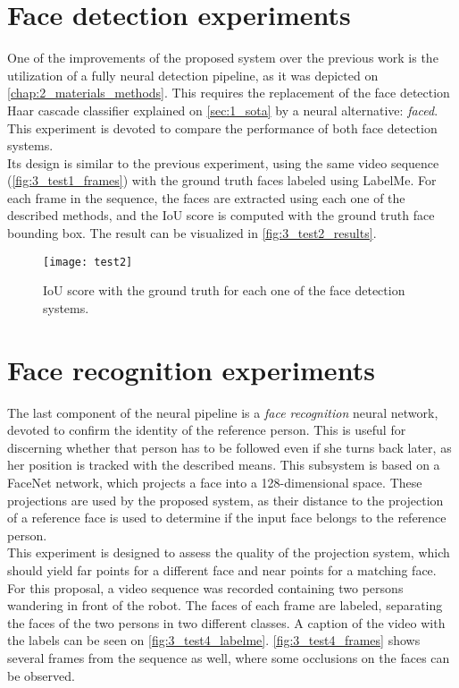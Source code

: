 \section{Face detection experiments}
\label{sec:3_test2}

One of the improvements of the proposed system over the previous work \cite{tfg} is the utilization of a fully neural detection pipeline, as it was depicted on \autoref{chap:2_materials_methods}. This requires the replacement of the face detection Haar cascade classifier explained on \autoref{sec:1_sota} by a neural alternative: \textit{faced}. This experiment is devoted to compare the performance of both face detection systems.\\

Its design is similar to the previous experiment, using the same video sequence (\autoref{fig:3_test1_frames}) with the ground truth faces labeled using LabelMe. For each frame in the sequence, the faces are extracted using each one of the described methods, and the IoU score is computed with the ground truth face bounding box. The result can be visualized in \autoref{fig:3_test2_results}.

\begin{figure}[h]
	\centering
	\texttt{[image: test2]}
	\caption{IoU score with the ground truth for each one of the face detection systems.}
	\label{fig:3_test2_results}
\end{figure}

\section{Face recognition experiments}

\label{sec:3_test4}
The last component of the neural pipeline is a \textit{face recognition} neural network, devoted to confirm the identity of the reference person. This is useful for discerning whether that person has to be followed even if she turns back later, as her position is tracked with the described means. This subsystem is based on a FaceNet \cite{facenet} network, which projects a face into a 128-dimensional space. These projections are used by the proposed system, as their distance to the projection of a reference face is used to determine if the input face belongs to the reference person.\\

This experiment is designed to assess the quality of the projection system, which should yield far points for a different face and near points for a matching face. For this proposal, a video sequence was recorded containing two persons wandering in front of the robot. The faces of each frame are labeled, separating the faces of the two persons in two different classes. A caption of the video with the labels can be seen on \autoref{fig:3_test4_labelme}. \autoref{fig:3_test4_frames} shows several frames from the sequence as well, where some occlusions on the faces can be observed. 

